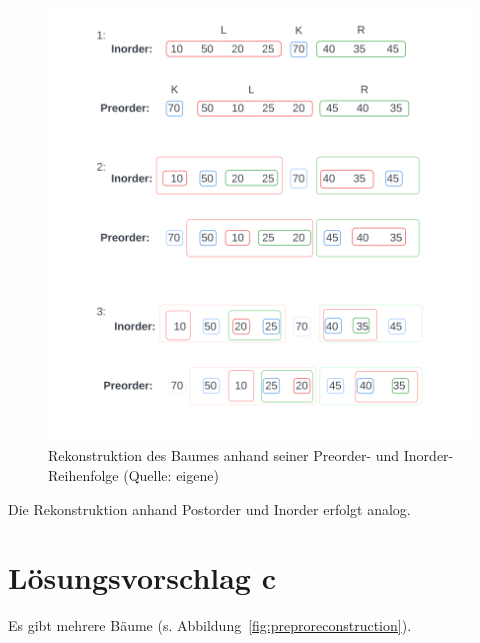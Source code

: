 \begin{figure}
    \begin{center}
        \includegraphics[scale=0.5]{chapters/5. Binäre Bäume/img/reconstruction}
        \caption{Rekonstruktion des Baumes anhand seiner Preorder- und Inorder-Reihenfolge (Quelle: eigene)}
        \label{fig:reconstruction}
    \end{center}
\end{figure}

Die Rekonstruktion anhand Postorder und Inorder erfolgt analog.

\newpage

\section{Lösungsvorschlag c}

Es gibt mehrere Bäume (s. Abbildung~\ref{fig:preproreconstruction}).


